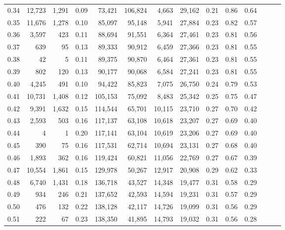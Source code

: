\begin{tabular}{rrrrrrrrrrrrrr}
0.34 &  12,723 &  1,291 &  0.09 &   73,421 &  106,824 &   4,663 &  29,162 &  0.21 &  0.86 &      0.64 \\
0.35 &  11,676 &  1,278 &  0.10 &   85,097 &   95,148 &   5,941 &  27,884 &  0.23 &  0.82 &      0.57 \\
0.36 &   3,597 &    423 &  0.11 &   88,694 &   91,551 &   6,364 &  27,461 &  0.23 &  0.81 &      0.56 \\
0.37 &     639 &     95 &  0.13 &   89,333 &   90,912 &   6,459 &  27,366 &  0.23 &  0.81 &      0.55 \\
0.38 &      42 &      5 &  0.11 &   89,375 &   90,870 &   6,464 &  27,361 &  0.23 &  0.81 &      0.55 \\
0.39 &     802 &    120 &  0.13 &   90,177 &   90,068 &   6,584 &  27,241 &  0.23 &  0.81 &      0.55 \\
0.40 &   4,245 &    491 &  0.10 &   94,422 &   85,823 &   7,075 &  26,750 &  0.24 &  0.79 &      0.53 \\
0.41 &  10,731 &  1,408 &  0.12 &  105,153 &   75,092 &   8,483 &  25,342 &  0.25 &  0.75 &      0.47 \\
0.42 &   9,391 &  1,632 &  0.15 &  114,544 &   65,701 &  10,115 &  23,710 &  0.27 &  0.70 &      0.42 \\
0.43 &   2,593 &    503 &  0.16 &  117,137 &   63,108 &  10,618 &  23,207 &  0.27 &  0.69 &      0.40 \\
0.44 &       4 &      1 &  0.20 &  117,141 &   63,104 &  10,619 &  23,206 &  0.27 &  0.69 &      0.40 \\
0.45 &     390 &     75 &  0.16 &  117,531 &   62,714 &  10,694 &  23,131 &  0.27 &  0.68 &      0.40 \\
0.46 &   1,893 &    362 &  0.16 &  119,424 &   60,821 &  11,056 &  22,769 &  0.27 &  0.67 &      0.39 \\
0.47 &  10,554 &  1,861 &  0.15 &  129,978 &   50,267 &  12,917 &  20,908 &  0.29 &  0.62 &      0.33 \\
0.48 &   6,740 &  1,431 &  0.18 &  136,718 &   43,527 &  14,348 &  19,477 &  0.31 &  0.58 &      0.29 \\
0.49 &     934 &    246 &  0.21 &  137,652 &   42,593 &  14,594 &  19,231 &  0.31 &  0.57 &      0.29 \\
0.50 &     476 &    132 &  0.22 &  138,128 &   42,117 &  14,726 &  19,099 &  0.31 &  0.56 &      0.29 \\
0.51 &     222 &     67 &  0.23 &  138,350 &   41,895 &  14,793 &  19,032 &  0.31 &  0.56 &      0.28 \\

\end{tabular}
